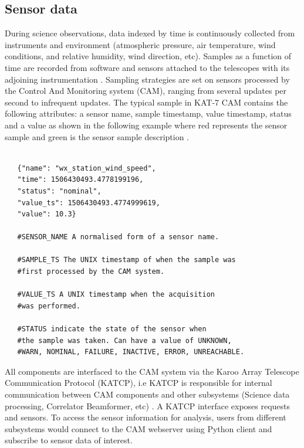 \subsection{Sensor data}

During science observations, data indexed by time is continuously collected from instruments and  environment (atmospheric pressure, air temperature,  wind conditions, and relative humidity, wind direction, etc). Samples as a function of time are recorded from software and sensors attached to the telescopes with its adjoining instrumentation \citep{slabberICALEPCS2017}. Sampling strategies are set on sensors processed by the Control And Monitoring system (CAM), ranging from several updates per second to infrequent updates. The typical sample in KAT-7 CAM contains the following attributes: a sensor name, sample timestamp, value timestamp, status and a value as shown in the following example where red represents the sensor sample and green is the sensor sample description  \citep{slabber2015overview, slabber2015illustrate}. 

 

\begin{tcolorbox} 
\begin{lstlisting}

   {"name": "wx_station_wind_speed",
   "time": 1506430493.4778199196,
   "status": "nominal",
   "value_ts": 1506430493.4774999619,
   "value": 10.3}

   #SENSOR_NAME A normalised form of a sensor name.

   #SAMPLE_TS The UNIX timestamp of when the sample was
   #first processed by the CAM system.

   #VALUE_TS A UNIX timestamp when the acquisition
   #was performed. 

   #STATUS indicate the state of the sensor when
   #the sample was taken. Can have a value of UNKNOWN,
   #WARN, NOMINAL, FAILURE, INACTIVE, ERROR, UNREACHABLE. 
\end{lstlisting}
\end{tcolorbox}

All components are interfaced to the CAM system via the Karoo Array Telescope Communication Protocol (KATCP), i.e KATCP is responsible for internal communication between CAM components and other subsystems (Science data processing, Correlator Beamformer, etc) \citep{slabber2015overview}. A KATCP interface exposes requests and sensors. To access the sensor information for analysis, users from different subsystems  would  connect to the CAM webserver using Python client and subscribe to sensor data of interest. 

